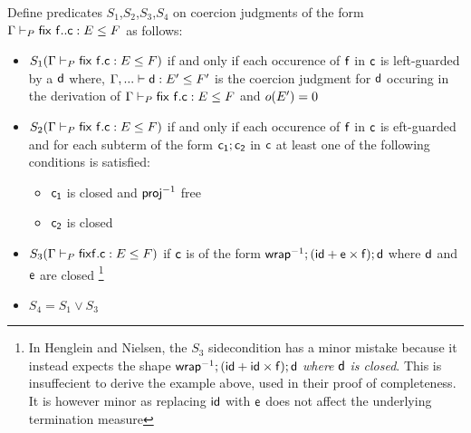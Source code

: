 \begin{definition}
 Define predicates $S_1$,$S_2$,$S_3$,$S_4$ on coercion judgments of the form $\Gamma \vdash_P \mathsf{\mathsf{fix}~\mathsf{f}.. c} : E \leq F$ as follows:
 \begin{itemize}
 \item $S_1(\Gamma \vdash_P \mathsf{\mathsf{fix}~\mathsf{f}.\mathsf{c}} : E \leq F)$ if and only if each occurence of $\mathsf{f}$ in $\mathsf{c}$ is left-guarded by a $\mathsf{d}$ where, $\Gamma ,... \vdash \mathsf{d} : E' \leq F'$ is the coercion judgment for $\mathsf{d}$ occuring in the derivation of $\Gamma \vdash_P \mathsf{\mathsf{fix}~\mathsf{f}.\mathsf{c}} : E \leq F$ and $o(E')=0$\\
 \item $S_2(\Gamma \vdash_P \mathsf{\mathsf{fix}~\mathsf{f}.\mathsf{c}} : E \leq F)$ if and only if each occurence of $\mathsf{f}$ in $\mathsf{c}$ is eft-guarded and for each subterm of the form $\mathsf{c_1}; \mathsf{c_2}$ in $\mathsf{c}$ at least one of the following conditions is satisfied:
   \begin{itemize}
   \item $\mathsf{c_1}$ is closed and $\mathsf{proj}^{-1}$ free
     \item $\mathsf{c_2}$ is closed
   \end{itemize}
\item $S_3(\Gamma \vdash_P \mathsf{\mathsf{fix} f. c} : E \leq F)$ if $\mathsf{c}$ is of the form $\mathsf{wrap}^{-1};(\mathsf{id}+\mathsf{e} \times \mathsf{f});\mathsf{d}$  where $\mathsf{d}$ and $\mathsf{e}$ are closed \footnote{In Henglein and Nielsen, the $S_3$ sidecondition has a minor mistake because it instead expects the shape $\mathsf{wrap}^{-1};(\mathsf{id}+\mathsf{id} \times \mathsf{f});\mathsf{d}$ \textit{where }$\mathsf{d}$ \textit{is closed}. This is insuffecient to derive the example above, used in their proof of completeness. It is however minor as replacing $\mathsf{id}$ with $\mathsf{e}$ does not affect the underlying termination measure}
\item $S_4 = S_1 \lor S_3$
   \end{itemize}
\end{definition}
